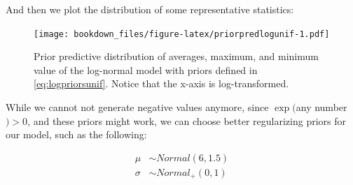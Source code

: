 \documentclass[12pt,]{krantz}
\newenvironment{Shaded}{\begin{snugshade}}{\end{snugshade}}
\newcommand{\DataTypeTok}[1]{\textcolor[rgb]{0.13,0.29,0.53}{#1}}
\newcommand{\DecValTok}[1]{\textcolor[rgb]{0.00,0.00,0.81}{#1}}
\newcommand{\FloatTok}[1]{\textcolor[rgb]{0.00,0.00,0.81}{#1}}
\newcommand{\KeywordTok}[1]{\textcolor[rgb]{0.13,0.29,0.53}{\textbf{#1}}}
\newcommand{\NormalTok}[1]{#1}
\newcommand{\OperatorTok}[1]{\textcolor[rgb]{0.81,0.36,0.00}{\textbf{#1}}}
\newcommand{\StringTok}[1]{\textcolor[rgb]{0.31,0.60,0.02}{#1}}
\theoremstyle{definition}
\theoremstyle{definition}
\theoremstyle{definition}
\theoremstyle{remark}
\begin{document}
And then we plot the distribution of some representative statistics:



\begin{Shaded}
\end{Shaded}

\begin{figure}
\centering
\texttt{[image: bookdown\_files/figure-latex/priorpredlogunif-1.pdf]}
\caption{\label{fig:priorpredlogunif}Prior predictive distribution of averages, maximum, and minimum value of the log-normal model with priors defined in \eqref{eq:logpriorsunif}. Notice that the x-axis is log-transformed.}
\end{figure}

While we cannot not generate negative values anymore, since \(\exp(\)any number\() > 0\), and these priors might work, we can choose better regularizing priors for our model, such as the following:

\begin{equation}
\begin{aligned}
\mu &\sim Normal(6, 1.5) \\
\sigma &\sim Normal_+(0, 1) \\
\end{aligned}
\label{eq:logpriorsnorm}
\end{equation}
\end{document}
